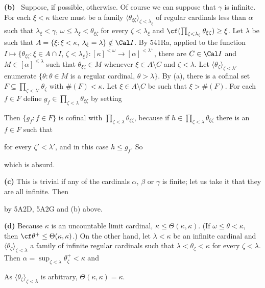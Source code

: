 {{\bf (b)} \Quer\ Suppose, if possible, otherwise.   Of course we can
suppose that $\gamma$ is infinite.   For each
$\xi<\kappa$ there must be a family
$\langle\theta_{\xi\zeta}\rangle_{\zeta<\lambda_{\xi}}$
of regular cardinals less than $\alpha$ such that
$\lambda_{\xi}<\gamma$, $\omega\le\lambda_{\xi}<\theta_{\xi\zeta}$
for every $\zeta<\lambda_{\xi}$
and $\cf(\prod_{\zeta<\lambda_{\xi}}\theta_{\xi\zeta})\ge\xi$.
Let $\lambda$ be such that
$A=\{\xi:\xi<\kappa$, $\lambda_{\xi}=\lambda\}\notin\Cal I$.
By 541Ra, applied to the function
$I\mapsto\{\theta_{\xi\zeta}:\xi\in A\cap I$, $\zeta<\lambda_{\xi}\}:
[\kappa]^{<\omega}\to[\alpha]^{<\lambda^+}$,
there are $C\in\Cal I$ and $M\in[\alpha]^{\le\lambda}$ such that
$\theta_{\xi\zeta}\in M$ whenever
$\xi\in A\setminus C$ and $\zeta<\lambda$.
Let $\langle\theta_{\zeta}\rangle_{\zeta<\lambda'}$ enumerate
$\{\theta:\theta\in M$ is a regular cardinal, $\theta>\lambda\}$.
By (a), there is a cofinal set
$F\subseteq\prod_{\zeta<\lambda'}\theta_{\zeta}$ with $\#(F)<\kappa$.
Let $\xi\in A\setminus C$ be such that $\xi>\#(F)$.
For each $f\in F$ define
$g_f\in\prod_{\zeta<\lambda}\theta_{\xi\zeta}$ by setting


\noindent Then $\{g_f:f\in F\}$ is cofinal with
$\prod_{\zeta<\lambda}\theta_{\xi\zeta}$, because if
$h\in\prod_{\zeta<\lambda}\theta_{\xi\zeta}$
there is an $f\in F$ such that


\noindent for every $\zeta'<\lambda'$, and in this case $h\le g_f$.   So


\noindent which is absurd.\ \Bang

\medskip

{\bf (c)} This is trivial if any of the cardinals $\alpha$, $\beta$ or
$\gamma$ is finite;  let us take it that they are all infinite.   Then


\noindent by 5A2D, 5A2G and (b) above.

\medskip

{\bf (d)} Because $\kappa$ is an uncountable limit cardinal,
$\kappa\le\Theta(\kappa,\kappa)$.   (If $\omega\le\theta<\kappa$, then
$\cf\theta^+\le\Theta(\kappa,\kappa)$.)
On the other hand, let $\lambda<\kappa$ be an infinite cardinal and
$\langle\theta_{\zeta}\rangle_{\zeta<\lambda}$ a family of infinite
regular cardinals such that $\lambda<\theta_{\zeta}<\kappa$ for every
$\zeta<\lambda$.   Then
$\alpha=\sup_{\zeta<\lambda}\theta_{\zeta}^+<\kappa$ and


\noindent As $\langle\theta_{\zeta}\rangle_{\zeta<\lambda}$ is
arbitrary, $\Theta(\kappa,\kappa)=\kappa$.
}%

